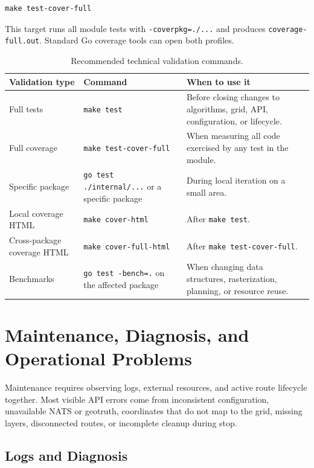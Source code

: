 \documentclass[12pt,a4paper]{report}
\begin{document}
\begin{lstlisting}
make test-cover-full
\end{lstlisting}

This target runs all module tests with \texttt{-coverpkg=./...} and produces
\texttt{coverage-full.out}. Standard Go coverage tools can open both profiles.

\begin{table}[H]
\centering
\begin{tabular}{|p{}|p{}|p{}|}
\hline
\textbf{Validation type} & \textbf{Command} & \textbf{When to use it} \\
\hline
Full tests &
\texttt{make test} &
Before closing changes to algorithms, grid, API, configuration, or lifecycle. \\
\hline
Full coverage &
\texttt{make test-cover-full} &
When measuring all code exercised by any test in the module. \\
\hline
Specific package &
\texttt{go test ./internal/...} or a specific package &
During local iteration on a small area. \\
\hline
Local coverage HTML &
\texttt{make cover-html} &
After \texttt{make test}. \\
\hline
Cross-package coverage HTML &
\texttt{make cover-full-html} &
After \texttt{make test-cover-full}. \\
\hline
Benchmarks &
\texttt{go test -bench=.} on the affected package &
When changing data structures, rasterization, planning, or resource reuse. \\
\hline
\end{tabular}
\caption{Recommended technical validation commands.}
\end{table}

\section{Maintenance, Diagnosis, and Operational Problems}

Maintenance requires observing logs, external resources, and active route
lifecycle together. Most visible API errors come from inconsistent
configuration, unavailable NATS or geotruth, coordinates that do not map to the
grid, missing layers, disconnected routes, or incomplete cleanup during stop.

\subsection{Logs and Diagnosis}
\end{document}
